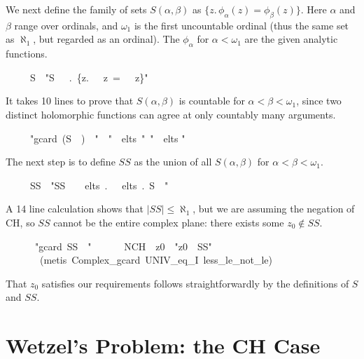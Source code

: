 \documentclass[runningheads]{llncs}
\begin{document}
\noindent
We next define the family of sets $S(\alpha,\beta)$ as  $\{z.\, \phi_\alpha (z) = \phi_\beta (z)\}$.
Here $\alpha$ and $\beta$ range over ordinals, and $\omega_1$ is the first uncountable ordinal (thus the same set as $\aleph_1$, but regarded as an ordinal).
The $\phi_\alpha$ for $\alpha<\omega_1$ are the given analytic functions.
\begin{isabelle}
\ \ \ \ \ S\ \ "S\ \isasymequiv \ \isasymlambda \isasymalpha \ \isasymbeta .\ \{z.\ \isasymphi \ \isasymalpha \ z\ =\ \isasymphi \ \isasymbeta \ z\}"
\end{isabelle}

It takes 10 lines to prove that $S(\alpha,\beta)$ is countable for $\alpha<\beta<\omega_1$,
since two distinct holomorphic functions can agree at only countably many arguments.
\begin{isabelle}
\ \ \ \ \ "gcard\ (S\ \isasymalpha \ \isasymbeta )\ \isasymle \ "\ \ "\isasymalpha\ \isasymin\ elts\ \isasymbeta "\ "\isasymbeta\ \isasymin\ elts "\ \ \isasymalpha \ \isasymbeta
\end{isabelle}

The next step is to define $SS$ as the union of all $S(\alpha,\beta)$ for $\alpha<\beta<\omega_1$.
\begin{isabelle}
\ \ \ \ \ SS\ \ "SS\ \isasymequiv\ \isasymSqunion \isasymbeta \ \isasymin \ elts\ .\ \isasymSqunion \isasymalpha \ \isasymin \ elts\ \isasymbeta .\ S\ \isasymalpha \ \isasymbeta "
\end{isabelle}

A 14 line calculation shows that $|SS|\le\aleph_1$, but we are assuming the negation of CH, so $SS$ cannot be the entire complex plane: there exists some $z_0\not\in SS$.
\begin{isabelle}
\ \ \ \ \ \ "gcard\ SS\ \isasymle \ "\ \isanewline
\ \ \ \ \ NCH\ \ z0\ \ "z0\ \isasymnotin \ SS"\isanewline
\ \ \ \ \ \ \ (metis\ Complex\_gcard\ UNIV\_eq\_I\ less\_le\_not\_le)
\end{isabelle}

That $z_0$ satisfies our requirements follows straightforwardly by the definitions of $S$ and $SS$.

\section{Wetzel's Problem: the CH Case}
\end{document}
